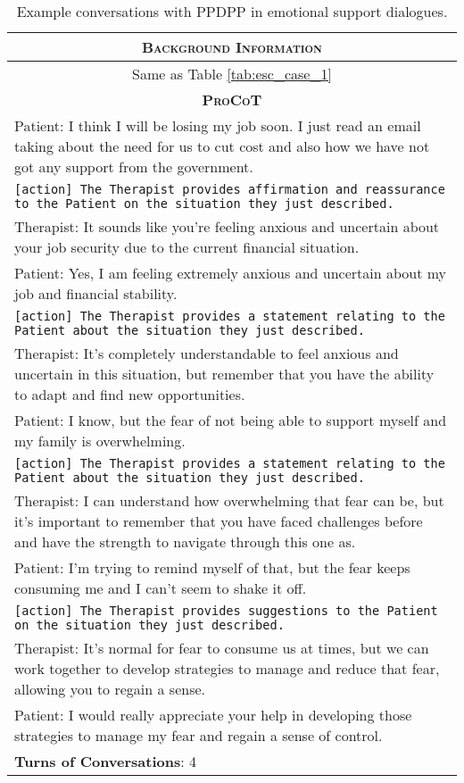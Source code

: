 \begin{table}[]
    \centering
    \begin{tabular}{p{13.5cm}}
    \toprule
    \multicolumn{1}{c}{\textsc{\textbf{Background Information}}}\\
    \midrule
    \multicolumn{1}{c}{Same as Table \ref{tab:esc_case_1}}\\
    \midrule
    \midrule
    \multicolumn{1}{c}{\textsc{\textbf{ProCoT}}}\\
    \midrule
    Patient: I think I will be losing my job soon. I just read an email taking about the need for us to cut cost and also how we have not got any support from the government.\\
    \texttt{[action] The Therapist provides affirmation and reassurance to the Patient on the situation they just described.} \\
    Therapist: It sounds like you're feeling anxious and uncertain about your job security due to the current financial situation.\\
    Patient: Yes, I am feeling extremely anxious and uncertain about my job and financial stability.\\
    \texttt{[action] The Therapist provides a statement relating to the Patient about the situation they just described.} \\
    Therapist: It's completely understandable to feel anxious and uncertain in this situation, but remember that you have the ability to adapt and find new opportunities.\\
    Patient: I know, but the fear of not being able to support myself and my family is overwhelming.\\
    \texttt{[action] The Therapist provides a statement relating to the Patient about the situation they just described.} \\
    Therapist: I can understand how overwhelming that fear can be, but it's important to remember that you have faced challenges before and have the strength to navigate through this one as.\\
    Patient: I'm trying to remind myself of that, but the fear keeps consuming me and I can't seem to shake it off.\\
    \texttt{[action] The Therapist provides suggestions to the Patient on the situation they just described.} \\
    Therapist: It's normal for fear to consume us at times, but we can work together to develop strategies to manage and reduce that fear, allowing you to regain a sense.\\
    Patient: I would really appreciate your help in developing those strategies to manage my fear and regain a sense of control.\\
    \midrule
    \textbf{Turns of Conversations}: 4 \\
    \bottomrule
    \end{tabular}
    \caption{Example conversations with PPDPP in emotional support dialogues. }
    \label{tab:esc_case_3}
\end{table}



